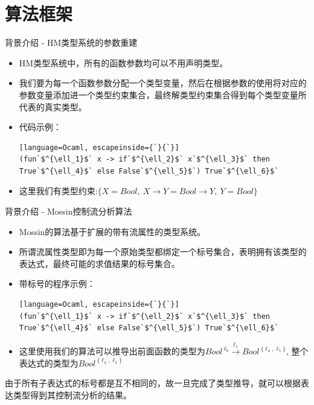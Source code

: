 \documentclass[9pt]{beamer}
\begin{document}
\section{算法框架}

\begin{frame}[fragile]{背景介绍 - HM类型系统的参数重建}
	\begin{itemize}
		\item HM类型系统中，所有的函数参数均可以不用声明类型。
		\vspace{0.3em}
		\item 我们要为每一个函数参数分配一个类型变量，然后在根据参数的使用将对应的参数变量添加进一个类型约束集合，最终解类型约束集合得到每个类型变量所代表的真实类型。
		\vspace{0.3em}
		\item 代码示例：\begin{lstlisting}[language=Ocaml, escapeinside={`}{`}]
(fun`$^{\ell_1}$` x -> if`$^{\ell_2}$` x`$^{\ell_3}$` then True`$^{\ell_4}$` else False`$^{\ell_5}$`) True`$^{\ell_6}$`
		\end{lstlisting}
		\vspace{0.2em}
		\item 这里我们有类型约束:$\{X = Bool,\ X\to Y = Bool\to Y,\ Y = Bool\}$
	\end{itemize}
\end{frame}

\begin{frame}[fragile]{背景介绍 - Mossin控制流分析算法}
	\begin{itemize}
		\item Mossin的算法基于扩展的带有流属性的类型系统。
		\vspace{0.5em}
		\item 所谓流属性类型即为每一个原始类型都绑定一个标号集合，表明拥有该类型的表达式，最终可能的求值结果的标号集合。
		\item 带标号的程序示例：
		\begin{lstlisting}[language=Ocaml, escapeinside={`}{`}]
(fun`$^{\ell_1}$` x -> if`$^{\ell_2}$` x`$^{\ell_3}$` then True`$^{\ell_4}$` else False`$^{\ell_5}$`) True`$^{\ell_6}$`
		\end{lstlisting}
		\item 这里使用我们的算法可以推导出前面函数的类型为$Bool^{\ \ell_6}\xrightarrow{\ell_1}Bool^{\ \{\ell_4, \ell_5\}}$, 整个表达式的类型为$Bool^{\ \{\ell_4, \ell_5\}}$
	\end{itemize}
	\vspace{0.2em}
	由于所有子表达式的标号都是互不相同的，故一旦完成了类型推导，就可以根据表达类型得到其控制流分析的结果。
\end{frame}
\end{document}
